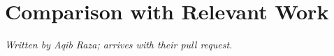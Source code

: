 \section{Comparison with Relevant Work}
\label{sec:comparison}

\emph{Written by Aqib Raza; arrives with their pull request.}
